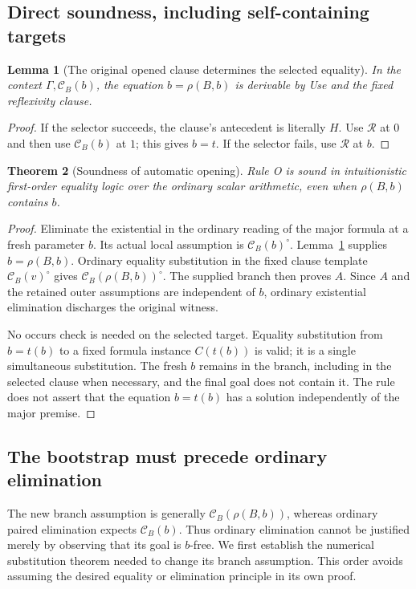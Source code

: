 \documentclass[11pt,letterpaper]{article}
\newtheorem{theorem}{Theorem}[section]
\newtheorem{lemma}[theorem]{Lemma}
\theoremstyle{definition}
\begin{document}
\subsection{Direct soundness, including self-containing targets}

\begin{lemma}[The original opened clause determines the selected equality]
\label{ao:selected-equality}
In the context $\Gamma,\mathcal C_B(b)$, the equation
$b=\rho(B,b)$ is derivable by Use and the fixed reflexivity clause.
\end{lemma}
\begin{proof}
If the selector succeeds, the clause's antecedent is literally $H$.
Use $\mathcal R$ at $0$ and then use $\mathcal C_B(b)$ at $1$; this
gives $b=t$.  If the selector fails, use $\mathcal R$ at $b$.
\end{proof}

\begin{theorem}[Soundness of automatic opening]
\label{ao:sound}
Rule O is sound in intuitionistic first-order equality logic over the
ordinary scalar arithmetic, even when $\rho(B,b)$ contains $b$.
\end{theorem}
\begin{proof}
Eliminate the existential in the ordinary reading of the major formula
at a fresh parameter $b$.  Its actual local assumption is
$\mathcal C_B(b)^\circ$.  Lemma~\ref{ao:selected-equality} supplies
$b=\rho(B,b)$.  Ordinary equality substitution in the fixed clause
template $\mathcal C_B(v)^\circ$ gives
$\mathcal C_B(\rho(B,b))^\circ$.  The supplied branch then proves $A$.
Since $A$ and the retained outer assumptions are independent of $b$,
ordinary existential elimination discharges the original witness.

No occurs check is needed on the selected target.  Equality substitution
from $b=t(b)$ to a fixed formula instance $C(t(b))$ is valid; it is a
single simultaneous substitution.  The fresh $b$ remains in the branch,
including in the selected clause when necessary, and the final goal does
not contain it.  The rule does not assert that the equation $b=t(b)$ has
a solution independently of the major premise.
\end{proof}

\subsection{The bootstrap must precede ordinary elimination}

The new branch assumption is generally
$\mathcal C_B(\rho(B,b))$, whereas ordinary paired elimination expects
$\mathcal C_B(b)$.  Thus ordinary elimination cannot be justified merely
by observing that its goal is $b$-free.  We first establish the numerical
substitution theorem needed to change its branch assumption.  This order
avoids assuming the desired equality or elimination principle in its own
proof.
\end{document}
